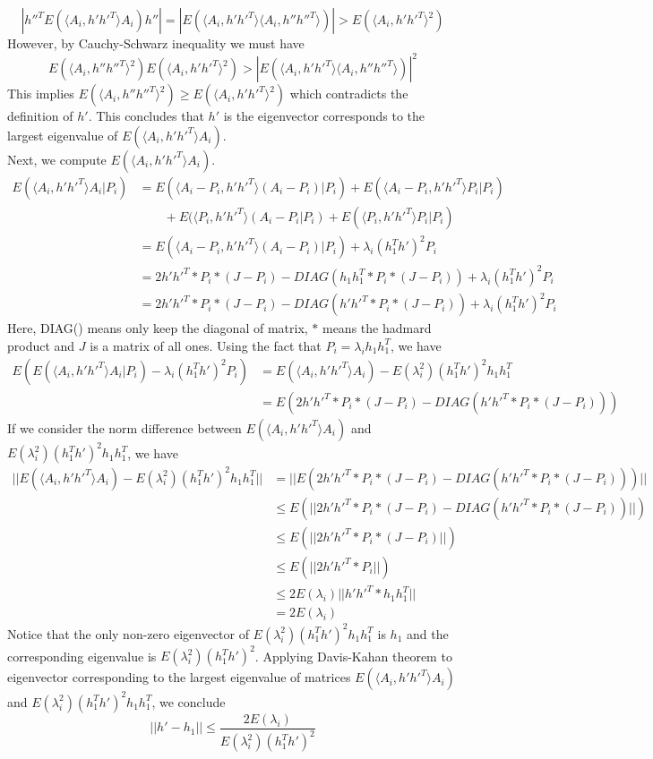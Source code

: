 \documentclass[a4paper]{article}
\newenvironment{proof}[1][Proof]{\begin{trivlist}
\item[\hskip \labelsep {\bfseries #1}]}{\end{trivlist}}
\begin{document}
\begin{proof}
\[ | h''^T E(\langle A_{i},h' h'^T \rangle A_{i}) h''| = |E(\langle A_{i},h' h'^T \rangle \langle A_{i},h'' h''^T \rangle)| > E(\langle A_{i},h' h'^T \rangle ^2)  \]
However, by Cauchy-Schwarz inequality we must have
\[ E(\langle A_{i},h'' h''^T \rangle^2)  E(\langle A_{i},h' h'^T \rangle^2) > |E(\langle A_{i},h' h'^T \rangle \langle A_{i},h'' h''^T \rangle)|^2 \]
This implies $E(\langle A_{i},h'' h''^T \rangle^2) \geq E(\langle A_{i},h' h'^T \rangle^2)$ which contradicts the definition of $h'$. This concludes that $h'$ is the eigenvector corresponds to the largest eigenvalue of $E(\langle A_{i},h' h'^T \rangle A_{i})$. \\

\noindent Next, we compute $E(\langle A_{i},h' h'^T \rangle A_{i})$.
\begin{align*}
E(\langle A_{i},h' h'^T \rangle A_{i}|P_i) 
&=   E( \langle A_{i}-P_i,h' h'^T \rangle (A_{i}-P_i)|P_i)+E(\langle A_{i}-P_i,h' h'^T \rangle P_i|P_i) \\
&\qquad {} +E(\langle P_i,h' h'^T \rangle (A_{i}-P_i|P_i)+E(\langle P_i,h' h'^T \rangle P_i|P_i) \\
&= E(\langle A_{i}-P_i,h' h'^T \rangle (A_{i}-P_i)|P_i) + \lambda_i (h_1^Th')^2 P_i \\
&=  2h' h'^T *P_i*(J-P_i) - DIAG(h_1 h_1^T *P_i*(J-P_i))  +\lambda_i (h_1^Th')^2 P_i \\
&=  2 h' h'^T *P_i*(J-P_i) - DIAG(h' h'^T*P_i*(J-P_i))  + \lambda_i (h_1^Th')^2 P_i
\end{align*}
Here, DIAG() means only keep the diagonal of matrix, $*$ means the hadmard product and $J$ is a matrix of all ones. Using the fact that $P_i=\lambda_i h_1 h_1 ^T$, we have 
\begin{align*}
E(E(\langle A_{i},h' h'^T \rangle A_{i}|P_i)-\lambda_i (h_1^Th')^2 P_i) 
&= E(\langle A_{i},h' h'^T \rangle A_{i}) - E(\lambda_i^2) (h_1^Th')^2 h_1 h_1^T \\
&= E(2 h' h'^T *P_i*(J-P_i) - DIAG(h' h'^T*P_i*(J-P_i)))
\end{align*}
If we consider the norm difference between $E( \langle A_{i},h' h'^T \rangle A_{i})$ and $ E(\lambda_i^2) (h_1^Th')^2 h_1 h_1^T$, we have
\begin{align*}
||E(\langle A_{i},h' h'^T \rangle A_{i} ) - E(\lambda_i^2) (h_1^Th')^2 h_1 h_1^T||
&= ||E(2 h' h'^T *P_i*(J-P_i) - DIAG(h' h'^T*P_i*(J-P_i)))|| \\
&\leq  E(||2 h' h'^T *P_i*(J-P_i) - DIAG(h' h'^T*P_i*(J-P_i))||) \\
&\leq  E(||2 h' h'^T *P_i*(J-P_i)||) \\
&\leq  E(||2 h' h'^T * P_i||) \\
&\leq  2 E(\lambda_i)|| h' h'^T * h_1 h_1^T|| \\
&=  2 E(\lambda_i) 
\end{align*}
Notice that the only non-zero eigenvector of $E(\lambda_i^2) (h_1^Th')^2 h_1 h_1^T$ is $h_1$ and the corresponding eigenvalue is $E(\lambda_i^2) (h_1^Th')^2$. Applying Davis-Kahan theorem to eigenvector corresponding to the largest eigenvalue of matrices $E(\langle A_{i},h' h'^T \rangle A_{i} )$ and $E(\lambda_i^2) (h_1^Th')^2 h_1 h_1^T$, we conclude
\[||h'-h_1|| \leq \frac{2 E(\lambda_i)}{E(\lambda_i^2)(h_1^T h')^2} \]
\end{proof}
\end{document}
